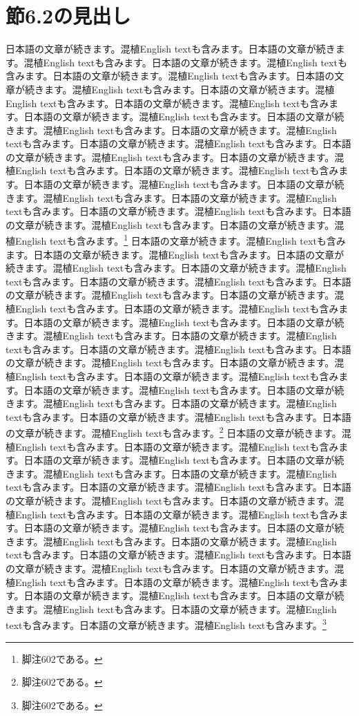 \documentclass[pdflatex,book]{jlreq}
\begin{document}
\section{節6.2の見出し}
日本語の文章が続きます。混植English textも含みます。日本語の文章が続きます。混植English textも含みます。日本語の文章が続きます。混植English textも含みます。日本語の文章が続きます。混植English textも含みます。日本語の文章が続きます。混植English textも含みます。日本語の文章が続きます。混植English textも含みます。日本語の文章が続きます。混植English textも含みます。日本語の文章が続きます。混植English textも含みます。日本語の文章が続きます。混植English textも含みます。日本語の文章が続きます。混植English textも含みます。日本語の文章が続きます。混植English textも含みます。日本語の文章が続きます。混植English textも含みます。日本語の文章が続きます。混植English textも含みます。日本語の文章が続きます。混植English textも含みます。日本語の文章が続きます。混植English textも含みます。日本語の文章が続きます。混植English textも含みます。日本語の文章が続きます。混植English textも含みます。日本語の文章が続きます。混植English textも含みます。日本語の文章が続きます。混植English textも含みます。日本語の文章が続きます。混植English textも含みます。\footnote{脚注602である。}
日本語の文章が続きます。混植English textも含みます。日本語の文章が続きます。混植English textも含みます。日本語の文章が続きます。混植English textも含みます。日本語の文章が続きます。混植English textも含みます。日本語の文章が続きます。混植English textも含みます。日本語の文章が続きます。混植English textも含みます。日本語の文章が続きます。混植English textも含みます。日本語の文章が続きます。混植English textも含みます。日本語の文章が続きます。混植English textも含みます。日本語の文章が続きます。混植English textも含みます。日本語の文章が続きます。混植English textも含みます。日本語の文章が続きます。混植English textも含みます。日本語の文章が続きます。混植English textも含みます。日本語の文章が続きます。混植English textも含みます。日本語の文章が続きます。混植English textも含みます。日本語の文章が続きます。混植English textも含みます。日本語の文章が続きます。混植English textも含みます。日本語の文章が続きます。混植English textも含みます。日本語の文章が続きます。混植English textも含みます。日本語の文章が続きます。混植English textも含みます。\footnote{脚注602である。}
日本語の文章が続きます。混植English textも含みます。日本語の文章が続きます。混植English textも含みます。日本語の文章が続きます。混植English textも含みます。日本語の文章が続きます。混植English textも含みます。日本語の文章が続きます。混植English textも含みます。日本語の文章が続きます。混植English textも含みます。日本語の文章が続きます。混植English textも含みます。日本語の文章が続きます。混植English textも含みます。日本語の文章が続きます。混植English textも含みます。日本語の文章が続きます。混植English textも含みます。日本語の文章が続きます。混植English textも含みます。日本語の文章が続きます。混植English textも含みます。日本語の文章が続きます。混植English textも含みます。日本語の文章が続きます。混植English textも含みます。日本語の文章が続きます。混植English textも含みます。日本語の文章が続きます。混植English textも含みます。日本語の文章が続きます。混植English textも含みます。日本語の文章が続きます。混植English textも含みます。日本語の文章が続きます。混植English textも含みます。日本語の文章が続きます。混植English textも含みます。\footnote{脚注602である。}
\end{document}
